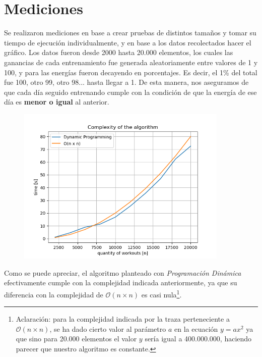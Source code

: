 \section{Mediciones}

Se realizaron mediciones en base a crear pruebas de distintos tamaños y tomar su tiempo de ejecución individualmente, y en base a los datos recolectados hacer el gráfico. Los datos fueron desde 2000 hasta 20.000 elementos, los cuales las ganancias de cada entrenamiento fue generada aleatoriamente entre valores de 1 y 100, y para las energías fueron decayendo en porcentajes. Es decir, el 1\% del total fue 100, otro 99, otro 98... hasta llegar a 1. De esta manera, nos aseguramos de que cada día seguido entrenando cumple con la condición de que la energía de ese día es \textbf{menor o igual} al anterior.

\begin{figure}[H]
    \centering
    \includegraphics[width=0.9\textwidth]{img/graphic.png}
\end{figure}

Como se puede apreciar, el algoritmo planteado con \textit{Programación Dinámica} efectivamente cumple con la complejidad indicada anteriormente, ya que su diferencia con la complejidad de $\mathcal{O}(n \times n)$ es casi nula\footnote{Aclaración: para la complejidad indicada por la traza perteneciente a $\mathcal{O}(n \times n)$, se ha dado cierto valor al parámetro $a$ en la ecuación $y=ax^2$ ya que sino para 20.000 elementos el valor $y$ sería igual a 400.000.000, haciendo parecer que nuestro algoritmo es constante.}.

